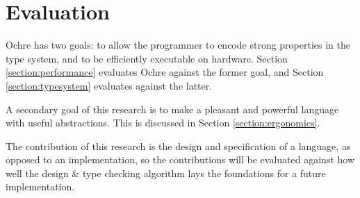 \documentclass[12pt,twoside]{report}
\begin{document}


\chapter{Evaluation}
Ochre has two goals: to allow the programmer to encode strong properties in the type system, and to be efficiently executable on hardware. Section \ref{section:performance} evaluates Ochre against the former goal, and Section \ref{section:typesystem} evaluates against the latter.

A secondary goal of this research is to make a pleasant and powerful language with useful abstractions. This is discussed in Section \ref{section:ergonomics}.

The contribution of this research is the design and specification of a language, as opposed to an implementation, so the contributions will be evaluated against how well the design \& type checking algorithm lays the foundations for a future implementation.
\end{document}
